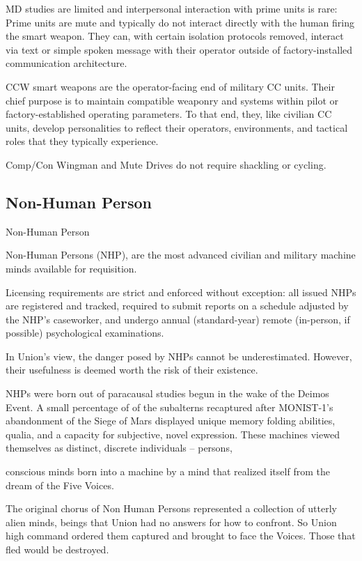 MD studies are limited and interpersonal interaction with prime units is rare: Prime units are mute  
and typically do not interact directly with the human firing the smart weapon. They can, with  
certain isolation protocols removed, interact via text or simple spoken message with their  
operator outside of factory-installed communication architecture.  
 

CCW smart weapons are the operator-facing end of military CC units. Their chief purpose is to  
maintain compatible weaponry and systems within pilot or factory-established operating  
parameters. To that end, they, like civilian CC units, develop personalities to reflect their  
operators, environments, and tactical roles that they typically experience. 
 

Comp/Con Wingman and Mute Drives do not require shackling or cycling.  

\subsection{Non-Human Person}
Non-Human Person   

Non-Human Persons (NHP), are the most advanced civilian and military machine minds available  
for requisition. 
 

Licensing requirements are strict and enforced without exception: all issued NHPs are registered  
and tracked, required to submit reports on a schedule adjusted by the NHP’s caseworker, and  
undergo annual (standard-year) remote (in-person, if possible) psychological examinations. 
 

In Union’s view, the danger posed by NHPs cannot be underestimated. However, their usefulness  
is deemed worth the risk of their existence. 
 

NHPs were born out of paracausal studies begun in the wake of the Deimos Event. A small  
percentage of of the subalterns recaptured after MONIST-1’s abandonment of the Siege of Mars  
displayed unique memory folding abilities, qualia, and a capacity for subjective, novel  
expression. These machines viewed themselves as distinct, discrete individuals -- persons,  

                                                                                                             


conscious minds born into a machine by a mind that realized itself from the dream of the Five  
Voices. 
 

The original chorus of Non Human Persons represented a collection of utterly alien minds, beings  
that Union had no answers for how to confront. So Union high command ordered them captured  
and brought to face the Voices. Those that fled would be destroyed.  
 

